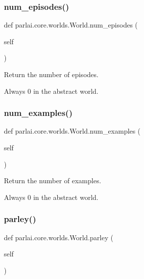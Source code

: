 \subsubsection{\texorpdfstring{num\+\_\+episodes()}{num\_episodes()}}
{\footnotesize\ttfamily def parlai.\+core.\+worlds.\+World.\+num\+\_\+episodes (\begin{DoxyParamCaption}\item[{}]{self }\end{DoxyParamCaption})}

\begin{DoxyVerb}Return the number of episodes.

Always 0 in the abstract world.
\end{DoxyVerb}
 \mbox{\label{classparlai_1_1core_1_1worlds_1_1World_a0402b615564d760fac542b8c5a504be5}} 
\subsubsection{\texorpdfstring{num\+\_\+examples()}{num\_examples()}}
{\footnotesize\ttfamily def parlai.\+core.\+worlds.\+World.\+num\+\_\+examples (\begin{DoxyParamCaption}\item[{}]{self }\end{DoxyParamCaption})}

\begin{DoxyVerb}Return the number of examples.

Always 0 in the abstract world.
\end{DoxyVerb}
 \mbox{\label{classparlai_1_1core_1_1worlds_1_1World_ac7e23e08adad68116e72162cd419786b}} 
\subsubsection{\texorpdfstring{parley()}{parley()}}
{\footnotesize\ttfamily def parlai.\+core.\+worlds.\+World.\+parley (\begin{DoxyParamCaption}\item[{}]{self }\end{DoxyParamCaption})}

